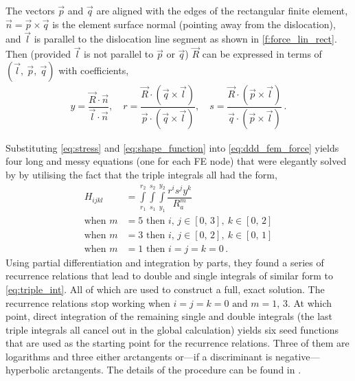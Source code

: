 The vectors $\vec{p}$ and $\vec{q}$ are aligned with the edges of the rectangular finite element, $\vec{n} = \vec{p} \times \vec{q}$ is the element surface normal (pointing away from the dislocation), and $\vec{l}$ is parallel to the dislocation line segment as shown in \cref{f:force_lin_rect}. Then (provided $\vec{l}$ is not parallel to $\vec{p}$ or $\vec{q}$) $\vec{R}$ can be expressed in terms of $(\vec{l},~\vec{p},~\vec{q})$ with coefficients,
\begin{align}
    y = \dfrac{\vec{R}\cdot \vec{n}}{\vec{l}\cdot \vec{n}} \label{eq:problem},\quad
    r = \dfrac{\vec{R}\cdot (\vec{q} \times \vec{l})}{\vec{p}\cdot (\vec{q} \times \vec{l})}, \quad
    s = \dfrac{\vec{R}\cdot (\vec{p} \times \vec{l})}{\vec{q}\cdot (\vec{p} \times \vec{l})}\,.
\end{align}

Substituting \cref{eq:stress} and \cref{eq:shape_function} into \cref{eq:ddd_fem_force} yields four long and messy equations (one for each FE node) that were elegantly solved by \citet{analytic_tractions} by utilising the fact that the triple integrals all had the form,
\begin{align}
    H_{ijkl}        & = \int\limits_{r_{1}}^{r_{2}}\int\limits_{s_{1}}^{s_{2}}\int\limits_{y_{1}}^{y_{2}} \dfrac{r^i s^j y^k}{R_{a}^{m}}\label{eq:triple_int} \\
    \textrm{when }m & = 5 \textrm{ then } i,\, j \in [0,\,3],~k \in [0,\,2]\nonumber                                                                          \\
    \textrm{when }m & = 3 \textrm{ then } i,\, j \in [0,\,2],~k \in [0,\,1]\nonumber                                                                          \\
    \textrm{when }m & = 1 \textrm{ then } i = j = k = 0\,.
\end{align}
Using partial differentiation and integration by parts, they found a series of recurrence relations that lead to double and single integrals of similar form to \cref{eq:triple_int}. All of which are used to construct a full, exact solution. The recurrence relations stop working when $i = j = k = 0 \textrm{ and } m = 1,\, 3$. At which point, direct integration of the remaining single and double integrals (the last triple integrals all cancel out in the global calculation) yields six seed functions that are used as the starting point for the recurrence relations. Three of them are logarithms and three either arctangents or---if a discriminant is negative---hyperbolic arctangents. The details of the procedure can be found in \cite{analytic_tractions}.

